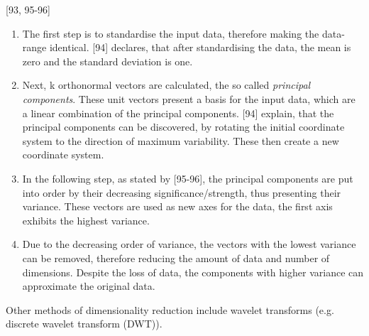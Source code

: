 \textcite{han2011data}[93, 95-96]
\begin{enumerate}
  \item The first step is to standardise the input data, therefore making the data-range identical. \textcite{DataMiningAndPredictiveAnalytics}[94] declares, that after standardising the data, the mean is zero and the standard deviation is one.
  \item Next, k orthonormal vectors are calculated, the so called \textit{principal components}. These unit vectors present a basis for the input data, which are a linear combination of the principal components. \textcite{DataMiningAndPredictiveAnalytics}[94] explain, that the principal components can be discovered, by rotating the initial coordinate system to the direction of maximum variability. These then create a new coordinate system. 
  \item In the following step, as stated by \textcite{han2011data}[95-96], the principal components are put into order by their decreasing significance/strength, thus presenting their variance. These vectors are used as new axes for the data, the first axis exhibits the highest variance.
  \item Due to the decreasing order  of variance, the vectors with the lowest variance can be removed, therefore reducing the amount of data and number of dimensions. Despite the loss of data, the components with higher variance can approximate the original data.
\end{enumerate}


Other methods of dimensionality reduction include wavelet transforms (e.g. discrete wavelet transform (DWT)).